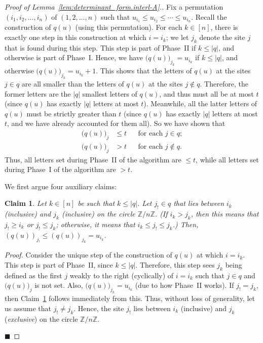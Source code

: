 \documentclass[reqno]{amsart}
\newcommand{\0}{\phantom{c}}
\newcommand{\ZZ}{\mathbb{Z}}
\newenvironment{subproof}{\textit{Proof.} }{\hfill$\blacksquare$\medskip}
\newcommand{\abs}[1]{\left| #1 \right|}
\newcommand{\tup}[1]{\left( #1 \right)}
\newcommand{\ive}[1]{\left[ #1 \right]}
\theoremstyle{plain}
\newtheorem{claim}[thm]{Claim}
\theoremstyle{definition}
\numberwithin{equation}{section}
\begin{document}
\begin{proof}[Proof of Lemma~\ref{lem:determinant_form.interl-A}.]
Fix a permutation $\tup{i_1, i_2, \dotsc, i_n}$ of $\tup{1, 2, \dotsc, n}$ such that $u_{i_1}\leq u_{i_2}\leq \cdots \leq u_{i_n}$.
Recall the construction of $q(u)$ (using this permutation).
For each $k \in \ive{n}$, there is exactly one step in this construction at which $i = i_k$; we let $j_k$ denote the site $j$ that is found during this step.
This step is part of Phase~II if $k \leq \abs{q}$, and otherwise is part of Phase~I.
Hence, we have $\bigl( q(u) \bigr)_{j_k}=u_{i_k}$ if $k\leq \abs{q}$, and otherwise $\bigl( q(u) \bigr)_{j_k} = u_{i_k}+1$.
This shows that the letters of $q(u)$ at the sites $j \in q$ are all smaller than the letters of $q(u)$ at the sites $j \notin q$.
Therefore, the former letters are the $\abs{q}$ smallest letters of $q(u)$, and thus must all be at most $t$ (since $q(u)$ has exactly $\abs{q}$ letters at most $t$).
Meanwhile, all the latter letters of $q(u)$ must be strictly greater than $t$ (since $q(u)$ has exactly $\abs{q}$ letters at most $t$, and we have already accounted for them all).
So we have shown that
\begin{subequations}
\begin{align}
\label{pf.lem:determinant_form.interl-A.1}
\bigl( q(u) \bigr)_j  & \leq t && \text{for each } j \in q;
\\
\label{pf.lem:determinant_form.interl-A.2}
\bigl( q(u) \bigr)_j  & > t && \text{for each } j \notin q.
\end{align}
\end{subequations}
Thus, all letters set during Phase~II of the algorithm are $\leq t$,
while all letters set during Phase~I of the algorithm are $> t$.


We first argue four auxiliary claims:

\begin{claim}
\label{claim:little_interlacing}
Let $k\in \ive{n} $ be such that $k\leq \left\vert
q\right\vert $. Let $j_{!} \in q$ that lies between $i_k$
(inclusive) and $j_k$ (inclusive) on the circle $\mathbb{Z}/n\mathbb{Z}$.
(If $i_k>j_k$, then this means that $j_{!}\geq i_k$ or $j_{!}\leq j_k
$; otherwise, it means that $i_k\leq j_{!}\leq j_k$.) Then, $\left(
q(u) \right) _{j_{!}}\leq \left( q(u) \right)
_{j_k}=u_{i_k}$.
\end{claim}

\begin{subproof}
Consider the unique step of the construction of $q(u)$ at which $i = i_k$.
This step is part of Phase~II, since $k \leq \abs{q}$.
Therefore, this step sees $j_k$ being defined as the first $j$ weakly to the right (cyclically) of $i = i_k$ such that $j \in q$ and $\bigl( q(u) \bigr)_j$ is not set.
Also, $\bigl( q(u) \bigr)_{j_k} = u_{i_k}$ (due to how Phase~II works).
If $j_{!} = j_k$, then Claim~\ref{claim:little_interlacing} follows immediately from this.
Thus, without loss of generality, let us assume that $j_{!} \neq j_k$.
Hence, the site $j_{!}$ lies between $i_k$ (inclusive) and $j_k$ (\emph{exclusive}) on the circle $\ZZ/n\ZZ$.


\end{subproof}
\end{proof}
\end{document}

